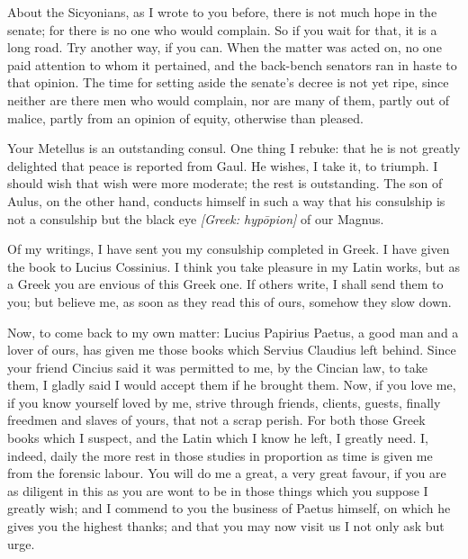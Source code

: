  About the Sicyonians, as I wrote to you before, there is not much hope in the senate; for there is no one who would complain. So if you wait for that, it is a long road. Try another way, if you can. When the matter was acted on, no one paid attention to whom it pertained, and the back-bench senators ran in haste to that opinion. The time for setting aside the senate's decree is not yet ripe, since neither are there men who would complain, nor are many of them, partly out of malice, partly from an opinion of equity, otherwise than pleased.

 Your Metellus is an outstanding consul. One thing I rebuke: that he is not greatly delighted that peace is reported from Gaul. He wishes, I take it, to triumph. I should wish that wish were more moderate; the rest is outstanding. The son of Aulus, on the other hand, conducts himself in such a way that his consulship is not a consulship but the black eye \textit{[Greek: hyp\=opion]} of our Magnus.

 Of my writings, I have sent you my consulship completed in Greek. I have given the book to Lucius Cossinius. I think you take pleasure in my Latin works, but as a Greek you are envious of this Greek one. If others write, I shall send them to you; but believe me, as soon as they read this of ours, somehow they slow down.

 Now, to come back to my own matter: Lucius Papirius Paetus, a good man and a lover of ours, has given me those books which Servius Claudius left behind. Since your friend Cincius said it was permitted to me, by the Cincian law, to take them, I gladly said I would accept them if he brought them. Now, if you love me, if you know yourself loved by me, strive through friends, clients, guests, finally freedmen and slaves of yours, that not a scrap perish. For both those Greek books which I suspect, and the Latin which I know he left, I greatly need. I, indeed, daily the more rest in those studies in proportion as time is given me from the forensic labour. You will do me a great, a very great favour, if you are as diligent in this as you are wont to be in those things which you suppose I greatly wish; and I commend to you the business of Paetus himself, on which he gives you the highest thanks; and that you may now visit us I not only ask but urge.
